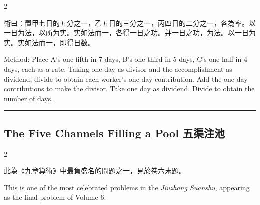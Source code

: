 \documentclass[10pt,a4paper]{article}
\newcommand{\longline}{\noindent\rule{\textwidth}{0.4pt}}
\begin{document}
\begin{paracol}{2}

\begin{leftcolumn*}
\begin{methodbi}[\textbf{術}]
術曰：置甲七日的五分之一，乙五日的三分之一，丙四日的二分之一，各為率。以一日为法，以所为实。实如法而一，各得一日之功。并一日之功，为法。以一日为实。实如法而一，即得日数。
\end{methodbi}
\end{leftcolumn*}

\begin{rightcolumn*}
\begin{methodbi}
Method: Place A's one-fifth in 7 days, B's one-third in 5 days, C's one-half in 4 days, each as a rate. Taking one day as divisor and the accomplishment as dividend, divide to obtain each worker's one-day contribution. Add the one-day contributions to make the divisor. Take one day as dividend. Divide to obtain the number of days.
\end{methodbi}
\end{rightcolumn*}

\end{paracol}

\vspace{0.3cm}
\longline
\vspace{0.3cm}

\subsection{The Five Channels Filling a Pool 五渠注池}

\begin{paracol}{2}
\begin{leftcolumn*}
此為《九章算術》中最負盛名的問題之一，見於卷六末題。
\end{leftcolumn*}
\begin{rightcolumn*}
This is one of the most celebrated problems in the \textit{Jiuzhang Suanshu}, appearing as the final problem of Volume 6.
\end{rightcolumn*}
\end{paracol}

\vspace{0.2cm}
\end{document}
